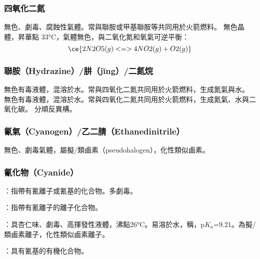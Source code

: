 \documentclass[a4paper,12pt]{report}
\begin{document}
\subsubsection{四氧化二氮}
無色、劇毒、腐蝕性氣體。常與聯胺或甲基聯胺等共同用於火箭燃料。
無色晶體，昇華點 33°C，氣體無色，與二氧化氮和氧氣可逆平衡：
\[\ce{2N2O5(g) <=> 4NO2(g) + O2(g)}\]
\subsubsection{聯胺（Hydrazine）/肼（jĭng）/二氮烷}
無色有毒液體，混溶於水。常與四氧化二氮共同用於火箭燃料，生成氮氣與水。
無色有毒液體，混溶於水。常與四氧化二氮共同用於火箭燃料，生成氮氣、水與二氧化碳。
分順反異構。
\subsubsection{氰氣（Cyanogen）/乙二腈（Ethanedinitrile）}
無色、劇毒氣體，屬擬/類鹵素（pseudohalogen），化性類似鹵素。
\subsubsection{氰化物（Cyanide）}
\bit
\item {}：指帶有氰離子或氰基的化合物。多劇毒。
\item {}：指帶有氰離子的離子化合物。
\item {}：具杏仁味、劇毒、高揮發性液體，沸點26°C。易溶於水，稱，p$K_a$=9.21。為擬/類鹵素離子，化性類似鹵素離子。
\item {}：具有氰基的有機化合物。
\eit
\end{document}
